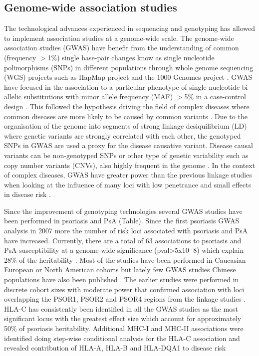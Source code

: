 \subsection{Genome-wide association studies}
The technological advances experienced in sequencing and genotyping has allowed to implement association studies at a genome-wide scale. The genome-wide association studies (GWAS) have benefit from the understanding of common (frequency ${>}$1\%) single base-pair changes know as single nucleotide polimorphisms (SNPs) in different populations through whole genome sequencing (WGS) projects such as HapMap \parencite{The international HapMaP Consortium} project and the 1000 Genomes project \parencite{The 1000 Genomes}. GWAS have focused in the association to a particular phenotype of single-nucleotide bi-allelic substitutions with minor allele frequency (MAF) ${>}$5\% in a case-control design \parencite{Ku2010}. This followed the hypothesis driving the field of complex diseases where common diseases are more likely to be caused by common variants \parencite{Schork2009}. Due to the organisation of the genome into segments of strong linkage desiquilibrium (LD) where genetic variants are strongly correlated with each other, the genotyped SNPs in GWAS are used a proxy for the disease causative variant. Disease causal variants can be non-genotyped SNPs or other type of genetic variability such as copy number variants (CNVs), also highly frequent in the genome \parencite{Hirschhorn2005, Ku2010}. In the context of complex diseases, GWAS have greater power than the previous linkage studies when looking at the influence of many loci with low penetrance and small effects in disease risk \parencite{Cui2010}.

Since the improvement of genotyping technologies several GWAS studies have been performed in psoriasis and PsA (Table). Since the first psoriasis GWAS analysis in 2007 more the number of risk loci associated with psoriasis and PsA have increased. Currently, there are a total of 63 associations to psoriasis and PsA susceptibility at a genome-wide significance (pval>5x10$^-8$) which explain 28\% of the heritability \parencite{Tsoi2017}. Most of the studies have been performed in Caucasian European or North American cohorts but lately few GWAS studies Chinese populations have also been published \parencite{Zhang2009, Sun2010, Yin2015}. The earlier studies were performed in discrete cohort sizes with moderate power that confirmed association with loci overlapping the PSOR1, PSOR2 and PSOR4 regions from the linkage studies \parencite{}. HLA-C has consistently been identified in all the GWAS studies as the most significant locus with the greatest effect size which account for approximately 50\% of psoriasis heritability. Additional MHC-I and MHC-II associations were identified doing step-wise conditional analysis for the HLA-C association and revealed contribution of HLA-A, HLA-B and HLA-DQA1 to disease risk \parencite{Okada2014}   

